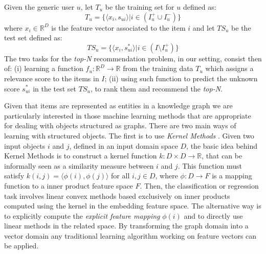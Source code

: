 Given the generic user $u$, let $T_u$ be the training set for $u$ defined as:
\[
T_u=\lbrace \langle x_i,s_{ui} \rangle |  i \in (I_u^+ \cup I_u^-)\rbrace
\] 
where $x_i \in \mathbb{R}^D$ is the feature vector associated to the item $i$ and let $TS_u$ be the test set defined as:
\[
TS_u=\lbrace \langle x_i,s_{ui}^* \rangle |  i \in (I \setminus I_u^+)\rbrace
\]
The two tasks for the \textit{top-N}\xspace recommendation problem, in our setting, consist then of: (i) learning a function $f_u:\mathbb{R}^D \rightarrow \mathbb{R}$ from the training data $T_u$  which assigns a relevance score to the items in $I$; (ii) using such function to predict the unknown score $s_{ui}^*$ in the test set $TS_u$, to rank them and recommend the \textit{top-N}\xspace.

Given that items are represented as entities in a knowledge graph we are particularly interested in those machine learning methods that are appropriate for dealing with objects structured as graphs. 
There are two main ways of learning with structured objects. The first is to use \textit{Kernel Methods} \cite{Cristianini}. 
Given two input objects $i$ and $j$, defined in an input domain space $D$, the basic idea behind Kernel Methods is to construct a kernel function $k: D \times D \rightarrow \mathbb{R}$, that can be informally seen as a similarity measure between $i$ and $j$. This function must satisfy $k(i,j) = \langle \phi(i),\phi(j) \rangle$ for all $i,j \in D$, where $\phi :D \rightarrow F$ is a mapping function to a inner product feature space $F$. 
Then, the classification or regression task involves linear convex methods based exclusively on inner products computed using the kernel in the embedding feature space. 
The alternative way is to explicitly compute the \textit{explicit feature mapping} $\phi(i)$ and to directly use linear methods in the related space. 
By transforming the graph domain into a vector domain any traditional learning algorithm working on feature vectors can be applied. 

